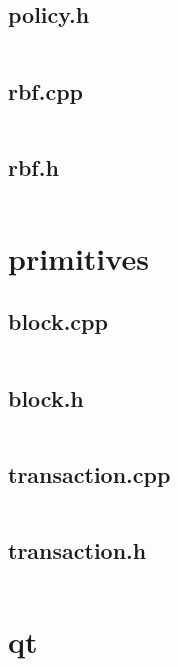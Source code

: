 \documentclass{article}
\begin{document}
\subsection{policy.h}
\inputminted{cpp}{/home/dufferzafar/dev/@clones/bitcoin/src/policy/policy.h}
\newpage

\subsection{rbf.cpp}
\inputminted{cpp}{/home/dufferzafar/dev/@clones/bitcoin/src/policy/rbf.cpp}
\newpage

\subsection{rbf.h}
\inputminted{cpp}{/home/dufferzafar/dev/@clones/bitcoin/src/policy/rbf.h}
\newpage

\section{primitives}

\subsection{block.cpp}
\inputminted{cpp}{/home/dufferzafar/dev/@clones/bitcoin/src/primitives/block.cpp}
\newpage

\subsection{block.h}
\inputminted{cpp}{/home/dufferzafar/dev/@clones/bitcoin/src/primitives/block.h}
\newpage

\subsection{transaction.cpp}
\inputminted{cpp}{/home/dufferzafar/dev/@clones/bitcoin/src/primitives/transaction.cpp}
\newpage

\subsection{transaction.h}
\inputminted{cpp}{/home/dufferzafar/dev/@clones/bitcoin/src/primitives/transaction.h}
\newpage

\section{qt}
\end{document}
